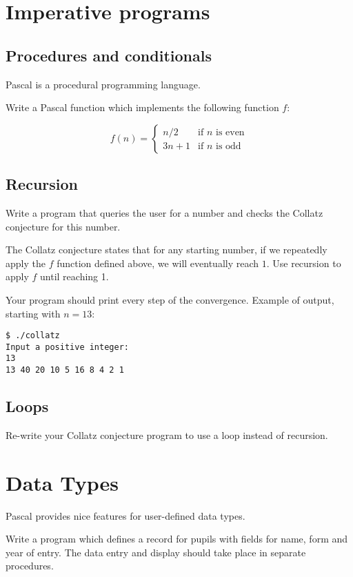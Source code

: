 \documentclass{../../tp}
\begin{document}
\section{Imperative programs}

\subsection{Procedures and conditionals}

Pascal is a procedural programming language. 

\begin{instruction}
	Write a Pascal function which implements the following function $f$:
		
	\begin{equation*}
		f(n) = 
			\begin{cases}
				n/2 & \text{if $n$ is even} \\
				3n + 1 & \text{if $n$ is odd} 
			\end{cases}
	\end{equation*}
\end{instruction}

\subsection{Recursion}
\begin{instruction}
Write a program that queries the user for a number and checks the Collatz conjecture for this number.

The Collatz conjecture states that for any starting number,  if we repeatedly apply the $f$ function defined above, we will eventually reach $1$. Use recursion to apply $f$ until reaching 1. 

Your program should print every step of the convergence. Example of output, starting with $n = 13$: 
\begin{verbatim}
$ ./collatz
Input a positive integer:
13
13 40 20 10 5 16 8 4 2 1
\end{verbatim}
\end{instruction}

\subsection{Loops}
\begin{instruction}
Re-write your Collatz conjecture program to use a loop instead of recursion.
\end{instruction}


\section{Data Types}

Pascal provides nice features for user-defined data types. 


\begin{instruction}
	Write a program which defines a record for pupils with fields for name, form and year of entry. The data entry and display should take place in separate procedures.
\end{instruction}
\end{document}
